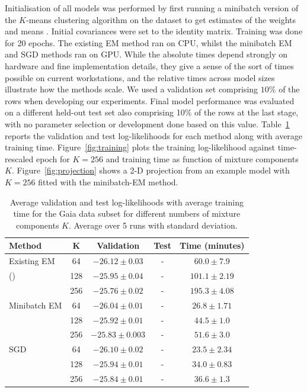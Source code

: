 \documentclass{article}
\begin{document}
Initialisation of all models was performed by first running a minibatch version of the $K$-means clustering algorithm on the dataset to get estimates of the weights and means \cite{sculleyWebscaleKmeansClustering2010}.
Initial covariances were set to the identity matrix.
Training was done for 20 epochs.
The existing EM method ran on CPU, whilst the minibatch EM and SGD methods ran on GPU\@.
While the absolute times depend strongly on hardware and fine implementation details, they give a sense of the sort of times possible on current workstations, and the relative times across model sizes illustrate how the methods scale.
We used a validation set comprising $10\%$ of the rows when developing our experiments.
Final model performance was evaluated on a different held-out test set also comprising 10\% of the rows at the last stage, with no parameter selection or development done based on this value.
Table~\ref{results-table} reports the validation and test log-likelihoods for each method along with average training time.
Figure~\ref{fig:training} plots the training log-likelihood against time-rescaled epoch for $K=256$ and training time as function of mixture components $K$.
Figure~\ref{fig:projection} shows a 2-D projection from an example model with $K=256$ fitted with the minibatch-EM method.

\begin{table}{}
  \caption{Average validation and test log-likelihoods with average training time for the Gaia data subset for different numbers of mixture components $K$.  Average over 5 runs with standard deviation.}
  \label{results-table}
  \centering
  \begin{tabular}{lcccc}
    \toprule
    Method     & K &  Validation     & Test & Time (minutes) \\
    \midrule
    Existing EM                                     & 64  & $-26.12 \pm 0.03$ & - & $60.0 \pm 7.9$\\
    (\citet{bovyExtremeDeconvolutionInferring2011}) & 128 & $-25.95 \pm 0.04$  & - & $101.1 \pm 2.19$    \\
                                                    & 256 & $-25.76 \pm 0.02$ & - & $195.3 \pm 4.08$ \\
    \midrule
    Minibatch EM  & 64  & $-26.04 \pm 0.01$   & - & $26.8 \pm 1.71$ \\
                  & 128 & $-25.92 \pm 0.01$   & - & $44.5 \pm 1.0$      \\
                  & 256 & $-25.83 \pm 0.003$  & - & $51.6 \pm 3.0$ \\
    \midrule
    SGD & 64    & $-26.10 \pm 0.02$  & - &$23.5 \pm 2.34$ \\
        & 128   & $-25.94 \pm 0.01$  & - & $34.0 \pm 0.83$ \\
        & 256   & $-25.84 \pm 0.01$  & - & $36.6 \pm 1.3$ \\
    \bottomrule
  \end{tabular}
\end{table}
\end{document}
